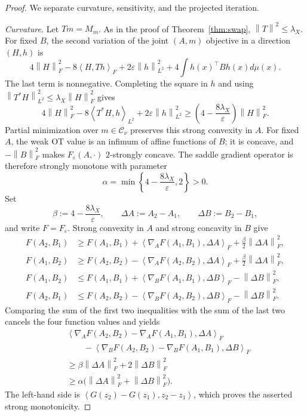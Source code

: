 \documentclass[11pt]{article}
\newcommand{\ip}[2]{\left\langle #1,#2\right\rangle}
\newcommand{\norm}[1]{\left\lVert #1\right\rVert}
\theoremstyle{plain}
\theoremstyle{definition}
\theoremstyle{remark}
\begin{document}
\begin{proof}
We separate curvature, sensitivity, and the projected iteration.

\emph{Curvature.}
Let $Tm=M_m$.  As in the proof of Theorem~\ref{thm:swap},
$\norm{T}^2\le\lambda_X$.  For fixed $B$, the second variation of the joint
$(A,m)$ objective in a direction $(H,h)$ is
\[
 4\norm H_F^2-8\ip H{Th}_F
 +2\varepsilon\norm h_{L^2}^2
 +4\int h(x)^\top Bh(x)d\mu(x).
\]
The last term is nonnegative.  Completing the square in $h$ and using
$\norm{T^*H}_{L^2}^2\le\lambda_X\norm H_F^2$ gives
\[
 4\norm H_F^2-8\ip{T^*H}{h}_{L^2}
 +2\varepsilon\norm h_{L^2}^2
 \ge\left(4-\frac{8\lambda_X}{\varepsilon}\right)\norm H_F^2.
\]
Partial minimization over $m\in\mathcal C_\nu$ preserves this strong convexity in
$A$.  For fixed $A$, the weak OT value is an infimum of affine functions of $B$;
it is concave, and $-\norm B_F^2$ makes $F_\varepsilon(A,\cdot)$
$2$-strongly concave. The saddle gradient operator is therefore strongly monotone
with parameter
\[
 \alpha=\min\left\{4-\frac{8\lambda_X}{\varepsilon},2\right\}>0.
\]
Set
\[
 \beta:=4-\frac{8\lambda_X}{\varepsilon},\qquad
 \Delta A:=A_2-A_1,\qquad \Delta B:=B_2-B_1,
\]
and write $F=F_\varepsilon$.  Strong convexity in $A$ and strong concavity in $B$
give
\begin{align*}
 F(A_2,B_1)
 &\ge F(A_1,B_1)
   +\ip{\nabla_AF(A_1,B_1)}{\Delta A}_F
   +\frac{\beta}{2}\norm{\Delta A}_F^2,\\
 F(A_1,B_2)
 &\ge F(A_2,B_2)
   -\ip{\nabla_AF(A_2,B_2)}{\Delta A}_F
   +\frac{\beta}{2}\norm{\Delta A}_F^2,\\
 F(A_1,B_2)
 &\le F(A_1,B_1)
   +\ip{\nabla_BF(A_1,B_1)}{\Delta B}_F
   -\norm{\Delta B}_F^2,\\
 F(A_2,B_1)
 &\le F(A_2,B_2)
   -\ip{\nabla_BF(A_2,B_2)}{\Delta B}_F
   -\norm{\Delta B}_F^2.
\end{align*}
Comparing the sum of the first two inequalities with the sum of the last two
cancels the four function values and yields
\begin{align*}
 &\ip{\nabla_AF(A_2,B_2)-\nabla_AF(A_1,B_1)}{\Delta A}_F\\
 &\qquad
 -\ip{\nabla_BF(A_2,B_2)-\nabla_BF(A_1,B_1)}{\Delta B}_F\\
 &\ge \beta\norm{\Delta A}_F^2+2\norm{\Delta B}_F^2\\
 &\ge \alpha\bigl(\norm{\Delta A}_F^2+\norm{\Delta B}_F^2\bigr).
\end{align*}
The left-hand side is $\ip{G(z_2)-G(z_1)}{z_2-z_1}$, which proves the asserted
strong monotonicity.


\end{proof}
\end{document}
